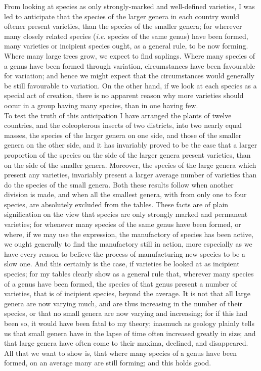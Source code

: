 \indent From looking at species as only strongly-marked and well-defined varieties, I was led to anticipate that the species of the larger genera in each country would oftener present varieties, than the species of the smaller genera; for wherever many closely related species (\emph{i.e.} species of the same genus) have been formed, many varieties or incipient species ought, as a general rule, to be now forming. Where many large trees grow, we expect to find saplings. Where many species of a genus have been formed through variation, circumstances have been favourable for variation; and hence we might expect that the circumstances would generally be still favourable to variation. On the other hand, if we look at each species as a special act of creation, there is no apparent reason why more varieties should occur in a group having many species, than in one having few. \\
\indent To test the truth of this anticipation I have arranged the plants of twelve countries, and the coleopterous insects of two districts, into two nearly equal masses, the species of the larger genera on one side, and those of the smaller genera on the other side, and it has invariably proved to be the case that a larger proportion of the species on the side of the larger genera present varieties, than on the side of the smaller genera. Moreover, the species of the large genera which present any varieties, invariably present a larger average number of varieties than do the species of the small genera. Both these results follow when another division is made, and when all the smallest genera, with from only one to four species, are absolutely excluded from the tables. These facts are of plain signification on the view that species are only strongly marked and permanent varieties; for whenever many species of the same genus have been formed, or where, if we may use the expression, the manufactory of species has been active, we ought generally to find the manufactory still in action, more especially as we have every reason to believe the process of manufacturing new species to be a slow one. And this certainly is the case, if varieties be looked at as incipient species; for my tables clearly show as a general rule that, wherever many species of a genus have been formed, the species of that genus present a number of varieties, that is of incipient species, beyond the average. It is not that all large genera are now varying much, and are thus increasing in the number of their species, or that no small genera are now varying and increasing; for if this had been so, it would have been fatal to my theory; inasmuch as geology plainly tells us that small genera have in the lapse of time often increased greatly in size; and that large genera have often come to their maxima, declined, and disappeared. All that we want to show is, that where many species of a genus have been formed, on an average many are still forming; and this holds good. \\
